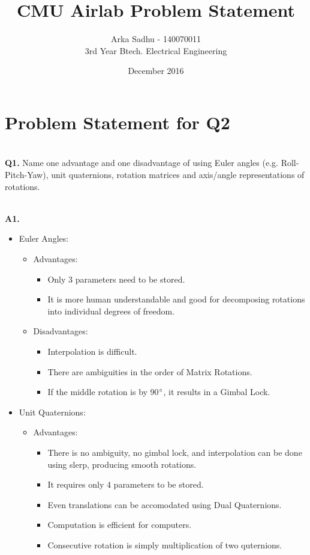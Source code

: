 \documentclass{article}
\title{CMU Airlab Problem Statement}
\author
{
  Arka Sadhu - 140070011\\
  3rd Year Btech. Electrical Engineering
}
\date{December 2016}
\newcommand\Problem[1]{
  \\
  \textbf{Q#1.}
}
\newcommand\Sol[1]{
  \\
  \textbf{A#1.}
  \\
}
\begin{document}
\maketitle

\section*{Problem Statement for Q2}
\Problem{1} Name one advantage and one disadvantage of using Euler angles (e.g. Roll-Pitch-Yaw), unit quaternions, rotation matrices and axis/angle representations of rotations.
\Sol{1}
\begin{itemize}
\item Euler Angles:
  \begin{itemize}
  \item Advantages:

    \begin{itemize}
    \item Only 3 parameters need to be stored.
    \item It is more human understandable and good for decomposing rotations into individual degrees of freedom.
    \end{itemize}

  \item Disadvantages:
    \begin{itemize}
    \item Interpolation is difficult.
    \item There are ambiguities in the order of Matrix Rotations.
    \item If the middle rotation is by 90$\degree$, it results in a Gimbal Lock.
    \end{itemize}
  \end{itemize}
  
\item Unit Quaternions:
  \begin{itemize}
  \item Advantages:
    \begin{itemize}
    \item There is no ambiguity, no gimbal lock, and interpolation can be done using slerp, producing smooth rotations.
    \item It requires only 4 parameters to be stored.
    \item Even translations can be accomodated using Dual Quaternions.
    \item Computation is efficient for computers.
    \item Consecutive rotation is simply multiplication of two quternions.
    \end{itemize}


\end{itemize}
\end{itemize}
\end{document}
